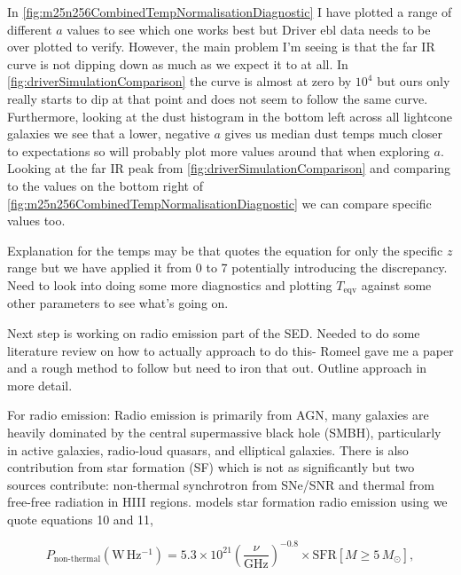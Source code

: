 \documentclass[a4paper, 11pt, oneside]{researchjournal} %
\begin{document}
\noindent In \cref{fig:m25n256CombinedTempNormalisationDiagnostic} I have plotted a range of different $a$ values to see which one works best but Driver ebl data needs to be over plotted to verify. However, the main problem I'm seeing is that the far IR curve is not dipping down as much as we expect it to at all. In \cref{fig:driverSimulationComparison} the curve is almost at zero by $10^4$ but ours only really starts to dip at that point and does not seem to follow the same curve. Furthermore, looking at the dust histogram in the bottom left across all lightcone galaxies we see that a lower, negative $a$ gives us median dust temps much closer to expectations so will probably plot more values around that when exploring $a$. Looking at the far IR peak from \cref{fig:driverSimulationComparison} and comparing to the values on the bottom right of \cref{fig:m25n256CombinedTempNormalisationDiagnostic} we can compare specific values too.

Explanation for the temps may be that \cite{liangDustTemperaturesHighredshift2019} quotes the equation for only the specific $z$ range but we have applied it from 0 to 7 potentially introducing the discrepancy. Need to look into doing some more diagnostics and plotting $T_\mathrm{eqv}$ against some other parameters to see what's going on. 



Next step is working on radio emission part of the SED. Needed to do some literature review on how to actually approach to do this- Romeel gave me a paper \cite{thomasRadioGalaxyPopulation2021} and a rough method to follow but need to iron that out. Outline approach in more detail.

For radio emission:
Radio emission is primarily from AGN, many galaxies are heavily dominated by the central supermassive black hole (SMBH), particularly in active galaxies, radio-loud quasars, and elliptical galaxies. There is also contribution from star formation (SF) which is not as significantly but two sources contribute: non-thermal synchrotron from SNe/SNR and thermal from free-free radiation in HIII regions. \cite{thomasRadioGalaxyPopulation2021} models star formation radio emission using \cite{condonRadioEmissionNormal1992} we quote equations 10 and 11,

\begin{equation}
P_{\mathrm{non\text{-}thermal}} (\mathrm{W\,Hz^{-1}})
= 5.3 \times 10^{21}
\left(\frac{\nu}{\mathrm{GHz}}\right)^{-0.8}
\times \mathrm{SFR}[M \geq 5\,M_\odot],
\end{equation}
\end{document}

